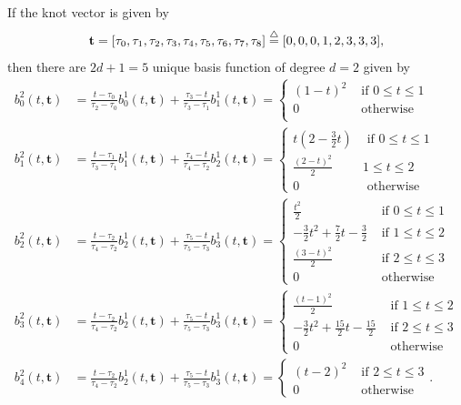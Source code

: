 If the knot vector is given by
\[
\mathbf{t} = [\tau_0, \tau_1, \tau_2, \tau_3, \tau_4, \tau_5, \tau_6, \tau_7, \tau_8] \stackrel{\triangle}{=} [0, 0, 0, 1, 2, 3, 3, 3],
\]
then there are $2d+1=5$ unique basis function of degree $d=2$ given by
\begin{align*}
b_0^2(t,  \mathbf{t}) &= \frac{t-\tau_0}{\tau_2-\tau_0} b_0^1(t, \mathbf{t}) + \frac{\tau_3-t}{\tau_3-\tau_1}b_1^1(t,  \mathbf{t}) 
	= \begin{cases} (1-t)^2   & \text{~if~} 0 \leq t \leq 1 \\
				    0 & \text{~otherwise~}  \\ 
 	  \end{cases}
\\ 
b_1^2(t,  \mathbf{t}) &= \frac{t-\tau_1}{\tau_3-\tau_1} b_1^1(t, \mathbf{t}) + \frac{\tau_4-t}{\tau_4-\tau_2}b_2^1(t,  \mathbf{t})
	= \begin{cases} t(2-\frac{3}{2}t) & \text{~if~} 0 \leq t \leq 1 \\ 
 									\frac{(2-t)^2}{2} & 1 \leq t \leq 2 \\
 									0 & \text{~otherwise}
 					    \end{cases}
\\ 
b_2^2(t,  \mathbf{t}) &= \frac{t-\tau_2}{\tau_4-\tau_2} b_2^1(t, \mathbf{t}) + \frac{\tau_5-t}{\tau_5-\tau_3}b_3^1(t,  \mathbf{t})
	= \begin{cases} \frac{t^2}{2} & \text{~if~} 0 \leq t \leq 1 \\ 
 					-\frac{3}{2}t^2 + \frac{7}{2}t - \frac{3}{2} & \text{~if~} 1 \leq t \leq 2 \\
 					\frac{(3-t)^2}{2} & \text{~if~} 2 \leq t \leq 3 \\
 					0 & \text{~otherwise}
 	  \end{cases}
\\ 
b_3^2(t,  \mathbf{t}) &= \frac{t-\tau_2}{\tau_4-\tau_2} b_2^1(t, \mathbf{t}) + \frac{\tau_5-t}{\tau_5-\tau_3}b_3^1(t,  \mathbf{t})
	= \begin{cases} \frac{(t-1)^2}{2} & \text{~if~} 1 \leq t \leq 2 \\ 
 					-\frac{3}{2}t^2 + \frac{15}{2}t-\frac{15}{2} & \text{~if~} 2 \leq t \leq 3 \\
 					0 & \text{~otherwise}
 	  \end{cases}
\\ 
b_4^2(t,  \mathbf{t}) &= \frac{t-\tau_2}{\tau_4-\tau_2} b_2^1(t, \mathbf{t}) + \frac{\tau_5-t}{\tau_5-\tau_3}b_3^1(t,  \mathbf{t})
	= \begin{cases} (t-2)^2 & \text{~if~} 2 \leq t \leq 3 \\ 
 					0 & \text{~otherwise}
 	  \end{cases}.	   	  
\end{align*}
